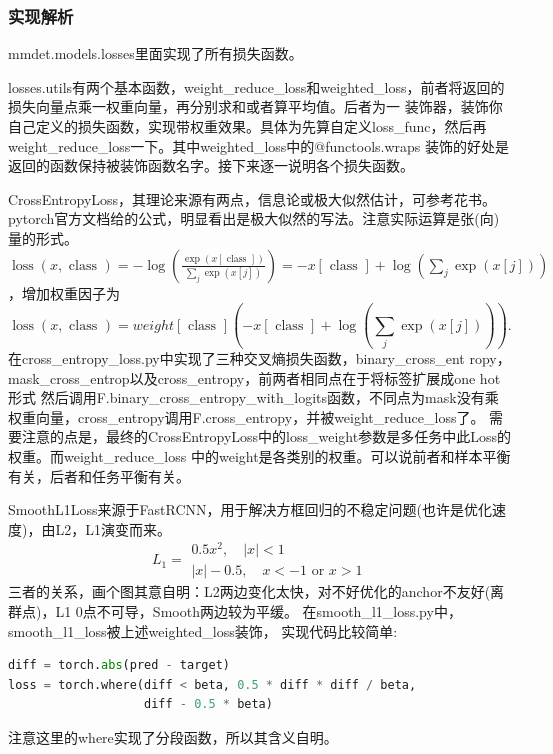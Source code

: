\documentclass[UTF8]{ctexart}
\begin{document}
\subsubsection{实现解析}
mmdet.models.losses里面实现了所有损失函数。

losses.utils有两个基本函数，weight\_reduce\_loss和weighted\_loss，前者将返回的损失向量点乘一权重向量，再分别求和或者算平均值。后者为一
装饰器，装饰你自己定义的损失函数，实现带权重效果。具体为先算自定义loss\_func，然后再weight\_reduce\_loss一下。其中weighted\_loss中的@functools.wraps
装饰的好处是返回的函数保持被装饰函数名字。接下来逐一说明各个损失函数。

CrossEntropyLoss，其理论来源有两点，信息论或极大似然估计，可参考花书。
pytorch官方文档给的公式，明显看出是极大似然的写法。注意实际运算是张(向)量的形式。
$\operatorname{loss}(x, \text { class })=-\log \left(\frac{\exp (x[\text { class }])}{\sum_{j} \exp (x[j])}\right)=
-x[\text { class }]+\log \left(\sum_{j} \exp (x[j])\right)$，增加权重因子为
$$\operatorname{loss}(x, \text { class })=
w e i g h t[\text { class }]
\left(-x[\text { class }]+\log \left(\sum_{j} \exp (x[j])\right)\right).$$
在cross\_entropy\_loss.py中实现了三种交叉熵损失函数，binary\_cross\_ent
ropy， mask\_cross\_entrop以及cross\_entropy，前两者相同点在于将标签扩展成one hot形式
然后调用F.binary\_cross\_entropy\_with\_logits函数，不同点为mask没有乘权重向量，cross\_entropy调用F.cross\_entropy，并被weight\_reduce\_loss了。
需要注意的点是，最终的CrossEntropyLoss中的loss\_weight参数是多任务中此Loss的权重。而weight\_reduce\_loss
中的weight是各类别的权重。可以说前者和样本平衡有关，后者和任务平衡有关。

SmoothL1Loss来源于FastRCNN，用于解决方框回归的不稳定问题(也许是优化速度)，由L2，L1演变而来。
$$L_{1}=\begin{array}{l}
	0.5 x^{2}, \quad|x|<1 \\
	|x|-0.5, \quad x<-1 \text { or } x>1
	\end{array}$$
三者的关系，画个图其意自明：L2两边变化太快，对不好优化的anchor不友好(离群点)，L1 0点不可导，Smooth两边较为平缓。
在smooth\_l1\_loss.py中，smooth\_l1\_loss被上述weighted\_loss装饰，
实现代码比较简单:
\lstset{style=mystyle}
\begin{lstlisting}[language=Python]
diff = torch.abs(pred - target)
loss = torch.where(diff < beta, 0.5 * diff * diff / beta,
				   diff - 0.5 * beta)
\end{lstlisting}
注意这里的where实现了分段函数，所以其含义自明。
\end{document}
